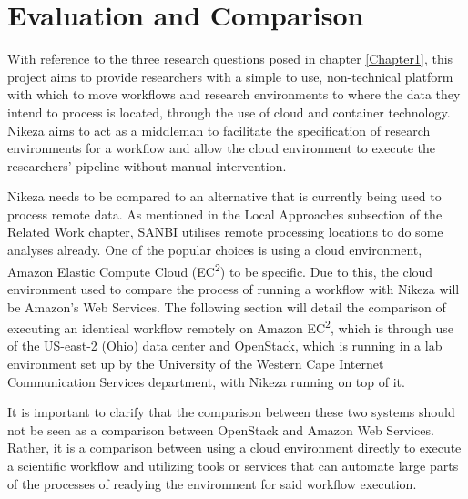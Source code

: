 
\chapter{Evaluation and Comparison} %

\label{Chapter4} %




With reference to the three research questions posed in chapter \ref{Chapter1}, this project aims to provide researchers with a simple to use, non-technical platform with which to move workflows and research environments to where the data they intend to process is located, through the use of cloud and container technology. Nikeza aims to act as a middleman to facilitate the specification of research environments for a workflow and allow the cloud environment to execute the researchers' pipeline without manual intervention. 

Nikeza needs to be compared to an alternative that is currently being used to process remote data. As mentioned in the Local Approaches subsection of the Related Work chapter, SANBI utilises remote processing locations to do some analyses already. One of the popular choices is using a cloud environment, Amazon Elastic Compute Cloud (EC\textsuperscript{2}) to be specific. Due to this, the cloud environment used to compare the process of running a workflow with Nikeza will be Amazon's Web Services. The following section will detail the comparison of executing an identical workflow remotely on Amazon EC\textsuperscript{2}, which is through use of the US-east-2 (Ohio) data center and OpenStack, which is running in a lab environment set up by the University of the Western Cape Internet Communication Services department, with Nikeza running on top of it.

It is important to clarify that the comparison between these two systems should not be seen as a comparison between OpenStack and Amazon Web Services. Rather, it is a comparison between using a cloud environment directly to execute a scientific workflow and utilizing tools or services that can automate large parts of the processes of readying the environment for said workflow execution.

